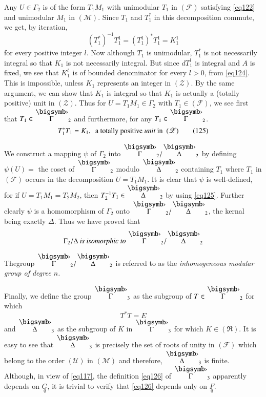 Any $U\in\Gamma_{2}$ is of the form $T_{1}M_{1}$ with unimodular
$T_{1}$ in $(\mathscr{F})$ satisfying \eqref{eq122} and unimodular
$M_{1}$ in $(\mathscr{M})$. Since $T_{1}$ and $T^{\ast}_{1}$ in this
decomposition commute, we get, by iteration,
\begin{equation*}
(T^{\ast}_{1})^{-1}T^{1}_{1} = (T^{1}_{1})^{\ast}T^{1}_{1} =
  K^{1}_{1}\tag{124}\label{eq124}   
\end{equation*}
for every positive integer $l$. Now although $T_{1}$ is unimodular,
$T^{\ast}_{1}$ is not necessarily integral so that $K_{1}$ is not
necessarily integral. But since $dT^{l}_{1}$ is integral and $A$ is
fixed, we see that $K^{l}_{1}$ is of bounded denominator for every
$l>0$, from \eqref{eq124}. This is impossible, unless $K_{1}$ represents
an integer in $(\mathscr{Z})$. By the same argument, we can show that
$K_{1}$ is integral so that $K_{1}$ is actually a (totally positive)
unit in $(\mathscr{Z})$. Thus for $U=T_{1}M_{1}\in\Gamma_{2}$ with
$T_{1}\in(\mathscr{F})$, we see first that
$T_{1}\in\overdot{\Gamma}_{2}$ and furthermore, for any
$T_{1}\in\overdot{\Gamma}_{2}$. 
\begin{equation*}
T^{\ast}_{1}T_{1}=K_{1}, \text{ \ a totally positive {\em unit} in \ }
(\mathscr{Z}) \tag{125}\label{eq125}
\end{equation*}

We construct a mapping $\psi$ of $\Gamma_{2}$ into
$\overdot{\Gamma}_{2}/\overdot{\Delta}_{2}$ by defining $\psi(U)=$ the
coset of $\overdot{\Gamma}_{2}$ modulo $\overdot{\Delta}_{2}$
containing $T_{1}$ where $T_{1}$ in $(\mathscr{F})$ occurs in the
decomposition $U=T_{1}M_{1}$. It is clear that $\psi$ is well-defined,
for if $U=T_{1}M_{1}=T_{2}M_{2}$, then $T^{-1}_{2}T_{1}\in
\overdot{\Delta}_{2}$ by using \eqref{eq125}. Further clearly $\psi$ is
a homomorphism of $\Gamma_{2}$ onto
$\overdot{\Gamma}_{2}/\overdot{\Delta}_{2}$, the kernal being exactly
$\Delta$. Thus we have proved that
$$
\Gamma_{2}/\Delta { \ \text{\em is isomorphic to} \ }
\overdot{\Gamma}_{2}/\overdot{\Delta}_{2} 
$$

The\pageoriginale group $\overdot{\Gamma}_{2}/\overdot{\Delta}_{2}$ is
referred to as the {\em inhomogeneous modular group of degree $n$.}

Finally, we define the group $\overdot{\Gamma}_{3}$ as the subgroup of
$T\in\overdot{\Gamma}_{2}$ for which
\begin{equation*}
T^{\ast}T=E\tag{126}\label{eq126}
\end{equation*}
and $\overdot{\Delta}_{3}$ as the subgroup of $K$ in
$\overdot{\Gamma}_{3}$ for which $K\in(\mathfrak{R})$. It is easy to
see that $\overdot{\Delta}_{3}$ is precisely the set of roots of unity
in $(\mathscr{F})$ which belong to the order $(\mathscr{U})$ in
$(\mathscr{M})$ and therefore, $\overdot{\Delta}_{3}$ is
finite. Although, in view of \eqref{eq117}, the definition \eqref{eq126}
of $\overdot{\Gamma}_{3}$ apparently depends on $\underset{q}{G}$, it
is trivial to verify that \eqref{eq126} depends only on
$\underset{q}{F}$.
\vskip -50pt


